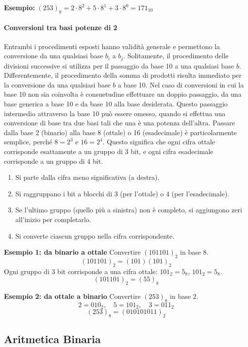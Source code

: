 \documentclass[oneside]{scrbook}
\begin{document}
\textbf{Esempio:}  
$(253)_8 = 2\cdot 8^2 + 5\cdot 8^1 + 3\cdot 8^0 = 171_{10}$

\paragraph{Conversioni tra basi potenze di 2}
Entrambi i procedimenti esposti hanno validità generale e permettono la conversione da una qualsiasi base $b_i$ a $b_j$. Solitamente, il procedimento delle divisioni successive si utilizza per il passaggio da base 10 a una qualsiasi base $b$. Differentemente, il procedimento della somma di prodotti risulta immediato per la conversione da una qualsiasi base $b$ a base 10. Nel caso di conversioni in cui la base 10 non sia coinvolta è consuetudine effettuare un doppio passaggio, da una base generica a base 10 e da base 10 alla base desiderata. Questo passaggio intermedio attraverso la base 10 può essere omesso, quando si eﬀettua una conversione di base tra due basi tali che una è una potenza dell’altra. Passare dalla base 2 (binario) alla base 8 (ottale) o 16 (esadecimale) è particolarmente semplice, perché $8 = 2^3$ e $16 = 2^4$.  
Questo significa che ogni cifra ottale corrisponde esattamente a un gruppo di 3 bit, e ogni cifra esadecimale corrisponde a un gruppo di 4 bit.

\begin{enumerate}
  \item Si parte dalla cifra meno significativa (a destra).
  \item Si raggruppano i bit a blocchi di 3 (per l’ottale) o 4 (per l’esadecimale).
  \item Se l’ultimo gruppo (quello più a sinistra) non è completo, si aggiungono zeri all’inizio per completarlo.
  \item Si converte ciascun gruppo nella cifra corrispondente.
\end{enumerate}

\textbf{Esempio 1: da binario a ottale}  
Convertire $(101101)_2$ in base 8.  
\[
(101101)_2 = (101)(101)_2
\]  
Ogni gruppo di 3 bit corrisponde a una cifra ottale:  
$101_2 = 5_8$, $101_2 = 5_8$.  
\[
(101101)_2 = (55)_8
\]

\textbf{Esempio 2: da ottale a binario}  
Convertire $(253)_8$ in base 2.  
\[
2 = 010_2, \quad 5 = 101_2, \quad 3 = 011_2
\]  
\[
(253)_8 = (010101011)_2
\]

\subsection{Aritmetica Binaria}
\end{document}
